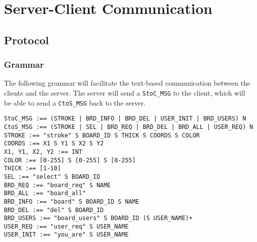 \section{Server-Client Communication}

\subsection{Protocol}

\subsubsection{Grammar}
The following grammar will facilitate the text-based communication between the clients and the server. The server will send a \texttt{StoC\_MSG} to the client, which will be able to send a \texttt{CtoS\_MSG} back to the server.

\vspace{5mm}

\setlength{\parindent}{0in}

\texttt{StoC\_MSG :== (STROKE | BRD\_INFO | BRD\_DEL | USER\_INIT | BRD\_USERS) N}\\

\texttt{CtoS\_MSG :== (STROKE | SEL | BRD\_REQ | BRD\_DEL | BRD\_ALL | USER\_REQ) N}\\


\texttt{STROKE :== "stroke" S BOARD\_ID S THICK S COORDS S COLOR}\\
\texttt{COORDS :== X1 S Y1 S X2 S Y2}\\
\texttt{X1, Y1, X2, Y2 :== INT}\\
\texttt{COLOR :== [0-255] S [0-255] S [0-255]}\\
\texttt{THICK :== [1-10]}\\

\texttt{SEL :== "select" S BOARD\_ID}\\

\texttt{BRD\_REQ :== "board\_req" S NAME}\\
\texttt{BRD\_ALL :== "board\_all"}\\
\texttt{BRD\_INFO :== "board" S BOARD\_ID S NAME}\\
\texttt{BRD\_DEL :== "del" S BOARD\_ID}\\
\texttt{BRD\_USERS :== "board\_users" S BOARD\_ID (S USER\_NAME)+}\\

\texttt{USER\_REQ :== "user\_req" S USER\_NAME}\\
\texttt{USER\_INIT :== "you\_are" S USER\_NAME}\\

